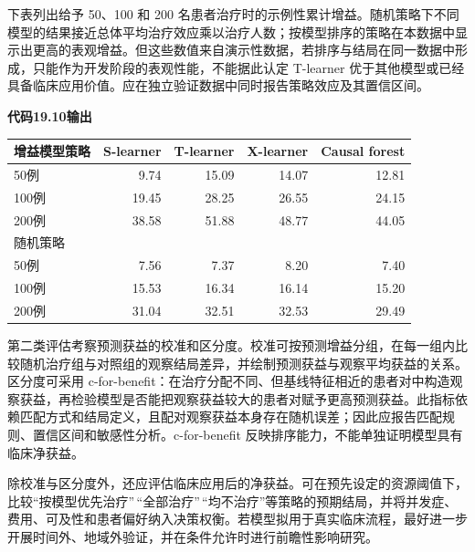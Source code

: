 \documentclass[
  chinese-hans,
  letterpaper,
  DIV=11,
  numbers=noendperiod]{scrreprt}
\newcounter{none} %
\begin{document}
下表列出给予 50、100 和 200
名患者治疗时的示例性累计增益。随机策略下不同模型的结果接近总体平均治疗效应乘以治疗人数；按模型排序的策略在本数据中显示出更高的表观增益。但这些数值来自演示性数据，若排序与结局在同一数据中形成，只能作为开发阶段的表观性能，不能据此认定
T-learner
优于其他模型或已经具备临床应用价值。应在独立验证数据中同时报告策略效应及其置信区间。

\begin{tcolorbox}[enhanced jigsaw, arc=.35mm, bottomrule=.15mm, breakable, colback=white, colframe=quarto-callout-note-color-frame, left=2mm, leftrule=.75mm, opacityback=0, rightrule=.15mm, toprule=.15mm]

\vspace{-3mm}\textbf{代码19.10输出}\vspace{3mm}

{\def\LTcaptype{none} %
\begin{longtable}[]{@{}lrrrr@{}}
\toprule\noalign{}
增益模型策略 & S-learner & T-learner & X-learner & Causal forest \\
\midrule\noalign{}
\endhead
\bottomrule\noalign{}
\endlastfoot
50例 & 9.74 & 15.09 & 14.07 & 12.81 \\
100例 & 19.45 & 28.25 & 26.55 & 24.15 \\
200例 & 38.58 & 51.88 & 48.77 & 44.05 \\
随机策略 & & & & \\
50例 & 7.56 & 7.37 & 8.20 & 7.40 \\
100例 & 15.53 & 16.34 & 16.14 & 15.20 \\
200例 & 31.04 & 32.51 & 32.53 & 29.49 \\
\end{longtable}
}

\end{tcolorbox}

第二类评估考察预测获益的校准和区分度。校准可按预测增益分组，在每一组内比较随机治疗组与对照组的观察结局差异，并绘制预测获益与观察平均获益的关系。区分度可采用
c-for-benefit：在治疗分配不同、但基线特征相近的患者对中构造观察获益，再检验模型是否能把观察获益较大的患者对赋予更高预测获益。此指标依赖匹配方式和结局定义，且配对观察获益本身存在随机误差；因此应报告匹配规则、置信区间和敏感性分析。c-for-benefit
反映排序能力，不能单独证明模型具有临床净获益。

除校准与区分度外，还应评估临床应用后的净获益。可在预先设定的资源阈值下，比较``按模型优先治疗''\,``全部治疗''\,``均不治疗''等策略的预期结局，并将并发症、费用、可及性和患者偏好纳入决策权衡。若模型拟用于真实临床流程，最好进一步开展时间外、地域外验证，并在条件允许时进行前瞻性影响研究。
\end{document}

